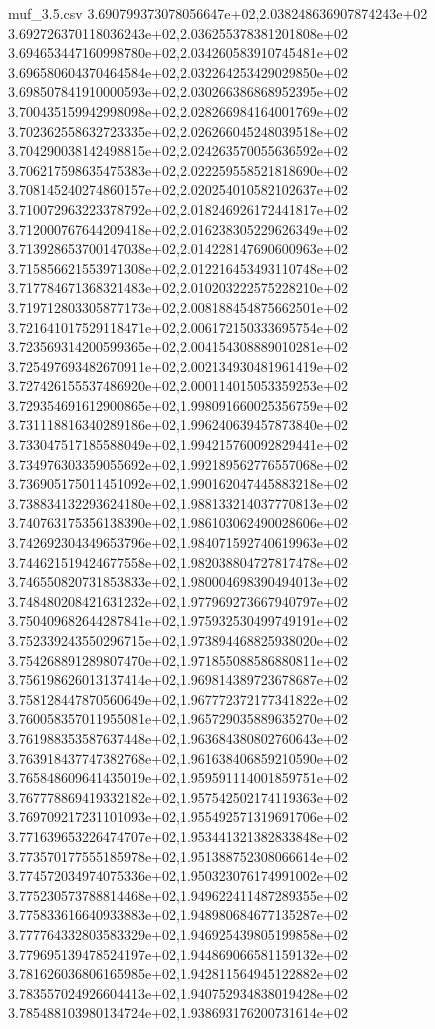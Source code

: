 \begin{filecontents*}{muf_3.5.csv}
3.690799373078056647e+02,2.038248636907874243e+02
3.692726370118036243e+02,2.036255378381201808e+02
3.694653447160998780e+02,2.034260583910745481e+02
3.696580604370464584e+02,2.032264253429029850e+02
3.698507841910000593e+02,2.030266386868952395e+02
3.700435159942998098e+02,2.028266984164001769e+02
3.702362558632723335e+02,2.026266045248039518e+02
3.704290038142498815e+02,2.024263570055636592e+02
3.706217598635475383e+02,2.022259558521818690e+02
3.708145240274860157e+02,2.020254010582102637e+02
3.710072963223378792e+02,2.018246926172441817e+02
3.712000767644209418e+02,2.016238305229626349e+02
3.713928653700147038e+02,2.014228147690600963e+02
3.715856621553971308e+02,2.012216453493110748e+02
3.717784671368321483e+02,2.010203222575228210e+02
3.719712803305877173e+02,2.008188454875662501e+02
3.721641017529118471e+02,2.006172150333695754e+02
3.723569314200599365e+02,2.004154308889010281e+02
3.725497693482670911e+02,2.002134930481961419e+02
3.727426155537486920e+02,2.000114015053359253e+02
3.729354691612900865e+02,1.998091660025356759e+02
3.731118816340289186e+02,1.996240639457873840e+02
3.733047517185588049e+02,1.994215760092829441e+02
3.734976303359055692e+02,1.992189562776557068e+02
3.736905175011451092e+02,1.990162047445883218e+02
3.738834132293624180e+02,1.988133214037770813e+02
3.740763175356138390e+02,1.986103062490028606e+02
3.742692304349653796e+02,1.984071592740619963e+02
3.744621519424677558e+02,1.982038804727817478e+02
3.746550820731853833e+02,1.980004698390494013e+02
3.748480208421631232e+02,1.977969273667940797e+02
3.750409682644287841e+02,1.975932530499749191e+02
3.752339243550296715e+02,1.973894468825938020e+02
3.754268891289807470e+02,1.971855088586880811e+02
3.756198626013137414e+02,1.969814389723678687e+02
3.758128447870560649e+02,1.967772372177341822e+02
3.760058357011955081e+02,1.965729035889635270e+02
3.761988353587637448e+02,1.963684380802760643e+02
3.763918437747382768e+02,1.961638406859210590e+02
3.765848609641435019e+02,1.959591114001859751e+02
3.767778869419332182e+02,1.957542502174119363e+02
3.769709217231101093e+02,1.955492571319691706e+02
3.771639653226474707e+02,1.953441321382833848e+02
3.773570177555185978e+02,1.951388752308066614e+02
3.774572034974075336e+02,1.950323076174991002e+02
3.775230573788814468e+02,1.949622411487289355e+02
3.775833616640933883e+02,1.948980684677135287e+02
3.777764332803583329e+02,1.946925439805199858e+02
3.779695139478524197e+02,1.944869066581159132e+02
3.781626036806165985e+02,1.942811564945122882e+02
3.783557024926604413e+02,1.940752934838019428e+02
3.785488103980134724e+02,1.938693176200731614e+02

\end{filecontents*}
